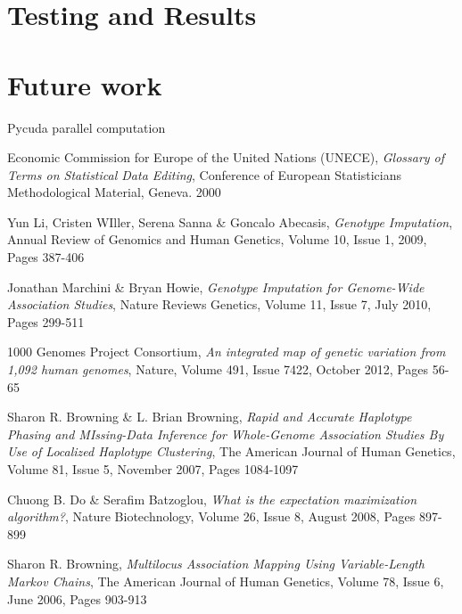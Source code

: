 \documentclass[a4paper,12pt,twoside,abstraction,titlepage]{article}
\begin{document}
\newpage
\section{Testing and Results}


\newpage
\section{Future work}
Pycuda parallel computation

\newpage


\begin{thebibliography}{99}

 Economic Commission for Europe of the United Nations (UNECE), \emph{Glossary of Terms on Statistical Data Editing}, Conference of European Statisticians Methodological Material, Geneva. 2000

 Yun Li, Cristen WIller, Serena Sanna \& Goncalo Abecasis, \emph{Genotype Imputation}, Annual Review of Genomics and Human Genetics, Volume 10, Issue 1,  2009, Pages 387-406

 Jonathan Marchini \& Bryan Howie, \emph{Genotype Imputation for Genome-Wide Association Studies}, Nature Reviews Genetics, Volume 11, Issue 7, July 2010, Pages 299-511

 1000 Genomes Project Consortium, \emph{An integrated map of genetic variation from 1,092 human genomes}, Nature, Volume 491, Issue 7422, October 2012, Pages 56-65

 Sharon R. Browning \& L. Brian Browning, \emph{Rapid and Accurate Haplotype Phasing and MIssing-Data Inference for Whole-Genome Association Studies By Use of Localized Haplotype Clustering}, The American Journal of Human Genetics, Volume 81, Issue 5, November 2007, Pages 1084-1097

 Chuong B. Do \& Serafim Batzoglou, \emph{What is the expectation maximization algorithm?}, Nature Biotechnology, Volume 26, Issue 8, August 2008, Pages 897-899


 Sharon R. Browning, \emph{Multilocus Association Mapping Using Variable-Length Markov Chains}, The American Journal of Human Genetics, Volume 78, Issue 6, June 2006, Pages 903-913



\end{thebibliography}
\end{document}
